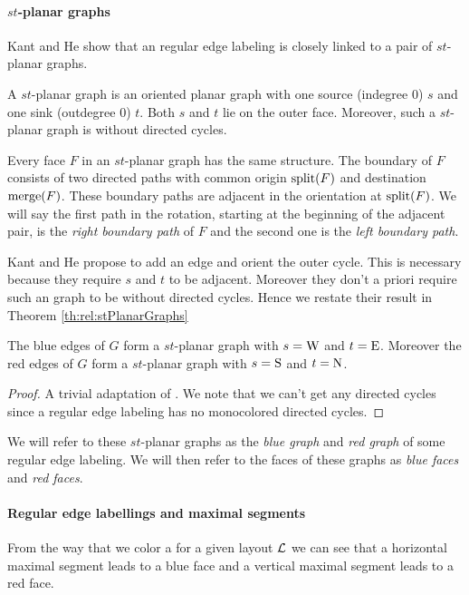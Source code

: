   \paragraph{$st$-planar graphs}
  Kant and He \cite[pp.179]{Kant1997} show that an regular edge labeling is closely linked to a pair of $st$-planar graphs.

  A $st$-planar graph is an oriented planar graph with one source (indegree 0) $s$ and one sink (outdegree 0) $t$. Both $s$ and $t$ lie on the outer face. Moreover, such a $st$-planar graph is without directed cycles.

  Every face $F$ in an $st$-planar graph has the same structure. The boundary of $F$ consists of two directed paths with common origin $\operatorname{split}(F)$ and  destination $\operatorname{merge}(F)$.
  These boundary paths are adjacent in the orientation at $\operatorname{split}(F)$. We will say the first path in the rotation, starting at the beginning of the adjacent pair, is the \emph{right boundary path} of $F$ and the second one is the \emph{left boundary path}.

  Kant and He propose to add an edge and orient the outer cycle. This is necessary because they require $s$ and $t$ to be adjacent. Moreover they don't a priori require such an graph to be without directed cycles. Hence we restate their result in Theorem \ref{th:rel:stPlanarGraphs}

  \begin{thrm}
    \label{th:rel:stPlanarGraphs}
    The blue edges of $G$ form a $st$-planar graph with $s= \mathrm{W}$ and $t=\mathrm{E}$. Moreover the red edges of $G$ form a $st$-planar graph with $s= \mathrm{S}$ and $t= \mathrm{N}$.
  \end{thrm}
  \begin{proof}
    A trivial adaptation of \cite[pp.179]{Kant1997}. We note that we can't get any directed cycles since a regular edge labeling has no monocolored directed cycles.
  \end{proof}

  We will refer to these $st$-planar graphs as the \emph{blue graph} and \emph{red graph} of some regular edge labeling. We will then refer to the faces of these graphs as \emph{blue faces} and \emph{red faces}.

  \paragraph{Regular edge labellings and maximal segments}
  From the way that we color a \rel for a given layout $\mathcal{L}$ we can see that a horizontal maximal segment leads to a blue face and a vertical maximal segment leads to a red face.

